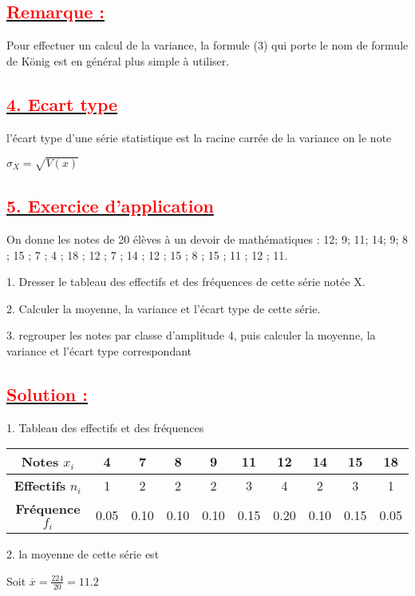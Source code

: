 \documentclass[12pt]{article}
\begin{document}
\subsection*{\underline{\textbf{\textcolor{red}{Remarque :}}}}
Pour effectuer un calcul de la variance, la formule (3)  qui porte le nom de formule de König est en général plus simple à utiliser. 
\subsection*{\underline{\textbf{\textcolor{red}{4.	Ecart type  }}}}
l’écart type d’une série statistique est la racine carrée de la variance on le note 

$\sigma_{X}=\sqrt{V(x)}$
\subsection*{\underline{\textbf{\textcolor{red}{5.	Exercice d’application }}}}
On donne les notes de 20 élèves à un devoir de mathématiques :
12;  9; 11; 14;  9; 8 ; 15 ; 7 ; 4 ; 18 ; 12 ; 7 ; 14 ; 12 ; 15 ; 8 ; 15 ; 11 ; 12 ; 11.

1.	Dresser le tableau des effectifs et des fréquences de cette série notée X.

2.	Calculer la moyenne, la variance et l’écart type de cette série.

3.	regrouper les notes par classe d’amplitude 4, puis calculer la moyenne, la variance et l’écart type correspondant
\subsection*{\underline{\textbf{\textcolor{red}{Solution :}}}}
1.	Tableau des effectifs et des fréquences

\begin{table}[h]
\begin{tabular}{|c|c|c|c|c|c|c|c|c|c|}
\textbf{Notes} \( x_i \) & 4 & 7 & 8 & 9 & 11 & 12 & 14 & 15 & 18 \\
\hline
\textbf{Effectifs} \( n_i \) & 1 & 2 & 2 & 2 & 3 & 4 & 2 & 3 & 1 \\
\hline
\textbf{Fréquence} \( f_i \) & 0.05 & 0.10 & 0.10 & 0.10 & 0.15 & 0.20 & 0.10 & 0.15 & 0.05 \\
\hline
\end{tabular}
\end{table}
2.	la moyenne de cette série est                                                                         

Soit $\overline{x}=\frac{224}{20}=11.2$
\end{document}
